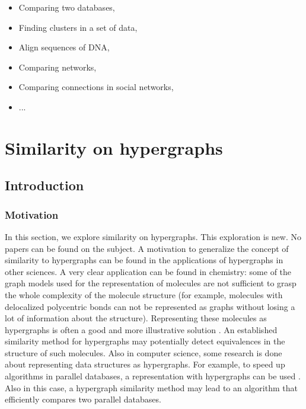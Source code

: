 \documentclass[a4paper,11pt]{report}
\begin{document}
\begin{itemize}
  \item Comparing two databases,
  \item Finding clusters in a set of data,
  \item Align sequences of DNA,
  \item Comparing networks,
  \item Comparing connections in social networks,
  \item ...
  
\end{itemize}



\chapter{Similarity on hypergraphs}
\section{Introduction}
\subsection{Motivation}
In this section, we explore similarity on hypergraphs. This exploration is new. No papers can be found on the subject. 
A motivation to generalize the concept of similarity to hypergraphs can be found 
in the applications of hypergraphs in other sciences. A very clear application 
can be found in chemistry: some of the graph models used for the representation of molecules are not 
sufficient to grasp the whole complexity of the molecule structure (for example, molecules with delocalized polycentric bonds can
not be represented as graphs without losing a lot of information about the structure). Representing these molecules as
hypergraphs is often a good and more illustrative solution \cite{moleculen}. An 
established similarity method for hypergraphs may potentially detect 
equivalences in the structure of such molecules. Also in computer 
science, some research is done about representing data structures as hypergraphs. 
For example, to speed up algorithms in parallel databases, a representation with 
hypergraphs can be used \cite{parallel}. Also in this case, a hypergraph 
similarity method may lead to an algorithm that efficiently compares two parallel databases.
\end{document}
